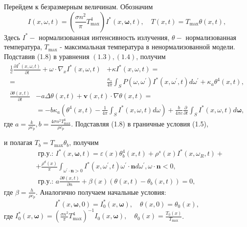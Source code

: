 Перейдем к безразмерным величинам. Обозначим
\[
    I(x, \omega, t)=\left(\frac{\sigma n^{2}}{\pi}
    T_{\max }^{4}\right) I^{*}(x, \boldsymbol{\omega}, t),
    \quad T(x, t)=T_{\max } \theta(x, t),
\]
Здесь $I^{*}-$ нормализованная интенсивность излучения, $\theta-$ нормализованная температура, $T_{\max }$ - максимальная температура в ненормализованной модели. Подставив (1.8) в уравнения $(1.3),(1.4)$, получим
\[
    \begin{aligned}
        \frac{1}{c} \frac{\partial I^{*}(x, \omega, t)}{\partial t}+\omega \cdot \nabla_{x} I^{*}(x, \omega, t) &+\kappa I^{*}(x, \omega, t)=\\
        =& \frac{\kappa_{s}}{4 \pi} \int_{S} P\left(\omega, \omega^{\prime}\right) I^{*}\left(x, \omega^{\prime}, t\right) d \omega^{\prime}+\kappa_{a} \theta^{4}(x, t),
    \end{aligned}
\]
\[
    \begin{aligned}
        \frac{\partial \theta(x, t)}{\partial t} &-a \Delta \theta(x, t)+\mathbf{v}(x, t) \cdot \nabla \theta(x, t)=\\
        &=-b \kappa_{a}\left(\theta^{4}(x, t)-\frac{1}{4 \pi} \int_{S} I^{*}(x, \omega, t) d \omega\right)+\frac{b}{4 \pi c} \frac{\partial}{\partial t} \int_{S} I^{*}(x, \omega, t) d \boldsymbol{\omega},
    \end{aligned}
\]
где $a=\frac{k}{\rho c_{p}}, b=\frac{4 \sigma n^{2} T_{\max }^{3}}{\rho c_{p}}$.
Подставляя (1.8) в граничные условия (1.5),

и полагая $T_{b}=T_{\max } \theta_{b}$, получим
\[
    \begin{aligned}
        & \text { гр.у.: } I^{*}(x, \boldsymbol{\omega}, t)=\varepsilon(x) \theta_{b}^{4}(x, t)+\rho^{s}(x) I^{*}\left(x, \omega_{R}, t\right)+ \\
        & +\frac{\rho^{d}(x)}{\pi} \int_{\omega^{\prime} \cdot \mathbf{n}>0} I^{*}\left(x, \omega^{\prime}, t\right) \omega^{\prime} \cdot \mathbf{n} d \omega^{\prime}, \omega \cdot \mathbf{n}<0, \\
        & \text { гр.у.: } a \frac{\partial \theta(x, t)}{\partial n}+\beta(x)\left(\theta(x, t)-\theta_{b}(x, t)\right)=0 \text {, }
    \end{aligned}
\]
где $\beta=\frac{h}{\rho c_{p}}$. Аналогично получаем начальные условия:
\[
    I^{*}(x, \boldsymbol{\omega}, 0)=I_{0}^{*}(x, \boldsymbol{\omega}), \quad \theta(x, 0)=\theta_{0}(x),
\]
где $I_{0}^{*}(x, \boldsymbol{\omega})=\left(\frac{\sigma n^{2}}{\pi}
T_{\max }^{4}\right)^{-1} I_{0}(x, \boldsymbol{\omega}), \quad \theta_{0}(x)=\frac{T_{0}(x)}{T_{\max }}$.


